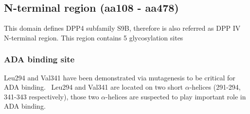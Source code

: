 \subsection{N-terminal region (aa108 - aa478)}

This domain defines DPP4 subfamily S9B, therefore is also referred as DPP IV N-terminal region. This region contains 5  glycosylation sites 

\subsubsection{ADA binding site}
Leu294 and Val341 have been demonstrated via mutagenesis to be critical for ADA binding.~\cite{Abbott_1999} Leu294 and Val341 are located on two short $\alpha$-helices (291-294, 341-343 respectively), those two $\alpha$-helices are suspected to play important role in ADA binding. 